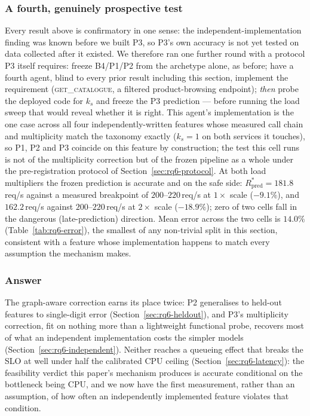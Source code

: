 \documentclass[journal, 10pt]{IEEEtran}
\begin{document}
\subsubsection{A fourth, genuinely prospective test}
\label{sec:rq6-prospective}
Every result above is confirmatory in one sense: the independent-implementation
finding was known before we built P3, so P3's own accuracy is not yet tested
on data collected after it existed. We therefore ran one further round with a
protocol P3 itself requires: freeze B4/P1/P2 from the archetype alone, as
before; have a fourth agent, blind to every prior result including this
section, implement the requirement (\textsc{get\_catalogue}, a filtered
product-browsing endpoint); \emph{then} probe the deployed code for $k_s$ and
freeze the P3 prediction --- before running the load sweep that would reveal
whether it is right. This agent's implementation is the one case across all
four independently-written features whose measured call chain and
multiplicity match the taxonomy exactly ($k_s=1$ on both services it touches),
so P1, P2 and P3 coincide on this feature by construction; the test this cell
runs is not of the multiplicity correction but of the frozen pipeline as a
whole under the pre-registration protocol of Section~\ref{sec:rq6-protocol}.
At both load multipliers the frozen prediction is accurate and on the safe
side: $R^{*}_{\text{pred}}=181.8\,$req/s against a measured breakpoint of
$200$--$220\,$req/s at $1\times$ scale ($-9.1\%$), and $162.2\,$req/s against
$200$--$220\,$req/s at $2\times$ scale ($-18.9\%$); zero of two cells fall in
the dangerous (late-prediction) direction. Mean error across the two cells is
$14.0\%$ (Table~\ref{tab:rq6-error}), the smallest of any non-trivial split in
this section, consistent with a feature whose implementation happens to match
every assumption the mechanism makes.

\subsubsection{Answer}
The graph-aware correction earns its place twice: P2 generalises to held-out
features to single-digit error (Section~\ref{sec:rq6-heldout}), and P3's
multiplicity correction, fit on nothing more than a lightweight functional
probe, recovers most of what an independent implementation costs the simpler
models (Section~\ref{sec:rq6-independent}). Neither reaches a queueing effect
that breaks the SLO at well under half the calibrated CPU ceiling
(Section~\ref{sec:rq6-latency}): the feasibility verdict this paper's
mechanism produces is accurate conditional on the bottleneck being CPU, and we
now have the first measurement, rather than an assumption, of how often an
independently implemented feature violates that condition.
\end{document}
